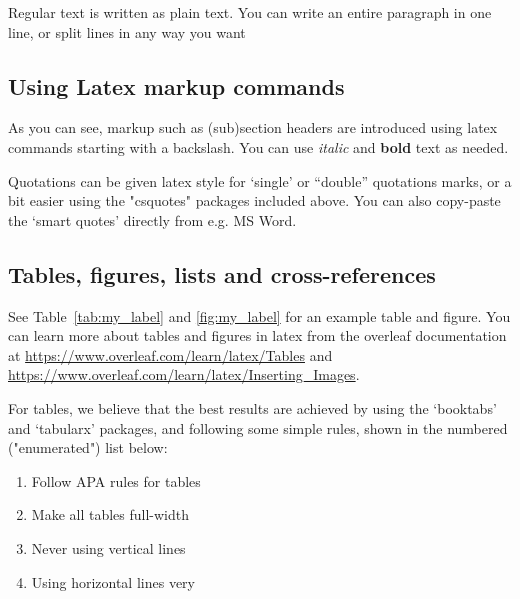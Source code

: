




Regular text is written as plain text. 
You can write an entire paragraph in one line, 
or split lines in any way you want

\subsection{Using Latex markup commands}

As you can see, markup such as (sub)section headers are introduced using latex commands starting with a backslash.
You can use \textit{italic} and \textbf{bold} text as needed. 

Quotations can be given latex style for `single' or ``double'' quotations marks,
or a bit easier using the "csquotes" packages included above.
You can also copy-paste the ‘smart quotes’ directly from e.g. MS Word.

\subsection{Tables, figures, lists and cross-references}

See Table~\ref{tab:my_label} and \ref{fig:my_label} for an example table and figure.
You can learn more about tables and figures in latex from the overleaf documentation at
\url{https://www.overleaf.com/learn/latex/Tables} and \url{https://www.overleaf.com/learn/latex/Inserting_Images}.

For tables, we believe that the best results are achieved by using the `booktabs' and `tabularx' packages,
and following some simple rules, shown in the numbered ("enumerated") list below:
\begin{enumerate}
    \item Follow APA rules for tables
    \item Make all tables full-width
    \item Never using vertical lines
    \item Using horizontal lines very 
\end{enumerate}

